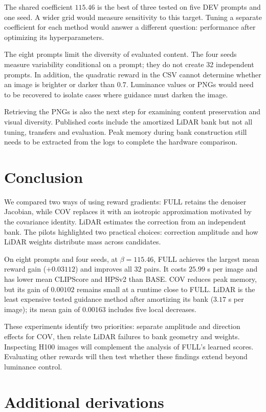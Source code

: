 \documentclass[11pt,a4paper]{article}
\begin{document}
The shared coefficient $115.46$ is the best of three tested on five DEV prompts and one seed. A wider grid would measure sensitivity to this target. Tuning a separate coefficient for each method would answer a different question: performance after optimizing its hyperparameters.

The eight prompts limit the diversity of evaluated content. The four seeds measure variability conditional on a prompt; they do not create 32 independent prompts. In addition, the quadratic reward in the CSV cannot determine whether an image is brighter or darker than $0.7$. Luminance values or PNGs would need to be recovered to isolate cases where guidance must darken the image.

Retrieving the PNGs is also the next step for examining content preservation and visual diversity. Published costs include the amortized LiDAR bank but not all tuning, transfers and evaluation. Peak memory during bank construction still needs to be extracted from the logs to complete the hardware comparison.

\section{Conclusion}
We compared two ways of using reward gradients: FULL retains the denoiser Jacobian, while COV replaces it with an isotropic approximation motivated by the covariance identity. LiDAR estimates the correction from an independent bank. The pilots highlighted two practical choices: correction amplitude and how LiDAR weights distribute mass across candidates.

On eight prompts and four seeds, at $\beta=115.46$, FULL achieves the largest mean reward gain ($+0.03112$) and improves all 32 pairs. It costs $25.99$ s per image and has lower mean CLIPScore and HPSv2 than BASE. COV reduces peak memory, but its gain of $0.00102$ remains small at a runtime close to FULL. LiDAR is the least expensive tested guidance method after amortizing its bank ($3.17$ s per image); its mean gain of $0.00163$ includes five local decreases.

These experiments identify two priorities: separate amplitude and direction effects for COV, then relate LiDAR failures to bank geometry and weights. Inspecting H100 images will complement the analysis of FULL's learned scores. Evaluating other rewards will then test whether these findings extend beyond luminance control.

\clearpage
\appendix
\section{Additional derivations}
\end{document}
